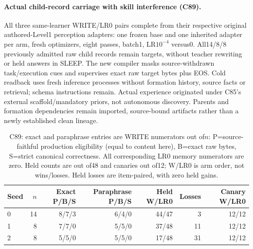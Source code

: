 \documentclass{article}
\begin{document}
\paragraph{Actual child-record carriage with skill interference (C89).}
All three same-learner WRITE/LR0 pairs complete from their respective original
authored-Level1 perception adapters: one frozen base and one inherited adapter per arm, fresh
optimizers, eight passes, batch1, LR$10^{-4}$ versus0. All14/8/8 previously
admitted raw child records remain targets, without teacher rewriting or held
answers in SLEEP. The new compiler masks source-withdrawn task/execution cues
and supervises exact raw target bytes plus EOS. Cold readback uses fresh inference
processes without formation history, source facts or retrieval; schema instructions
remain. Actual experience originated under C85's external scaffold/mandatory
priors, not autonomous discovery. Parents and formation dependencies remain
imported, source-bound artifacts rather than a newly established clean lineage.
\begin{table}[htbp]
\centering\small
\begin{tabular}{lrrrrrr}
\toprule
Seed & $n$ & Exact P/B/S & Paraphrase P/B/S & Held W/LR0 & Losses & Canary W/LR0 \\
\midrule
0 & 14 & 8/7/3 & 6/4/0 & 44/47 & 3 & 12/12 \\
1 & 8 & 7/7/0 & 5/5/0 & 37/48 & 11 & 12/12 \\
2 & 8 & 5/5/0 & 5/5/0 & 17/48 & 31 & 12/12 \\
\bottomrule
\end{tabular}
\caption{C89: exact and paraphrase entries are WRITE numerators out of$n$:
P=source-faithful production eligibility (equal to content here), B=exact raw
bytes, S=strict canonical correctness. All corresponding LR0 memory numerators
are zero. Held counts are out of48 and canaries out of12; W/LR0 is arm order,
not wins/losses. Held losses are item-paired, with zero held gains.}
\label{tab:seq153-memory}
\end{table}
\end{document}

